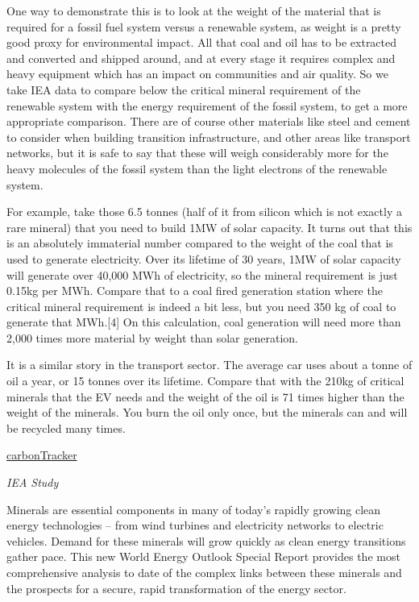 \documentclass[
]{book}
\begin{document}
One way to demonstrate this is to look at the weight of the material that is required for a fossil fuel system versus a renewable system, as weight is a pretty good proxy for environmental impact. All that coal and oil has to be extracted and converted and shipped around, and at every stage it requires complex and heavy equipment which has an impact on communities and air quality. So we take IEA data to compare below the critical mineral requirement of the renewable system with the energy requirement of the fossil system, to get a more appropriate comparison. There are of course other materials like steel and cement to consider when building transition infrastructure, and other areas like transport networks, but it is safe to say that these will weigh considerably more for the heavy molecules of the fossil system than the light electrons of the renewable system.

For example, take those 6.5 tonnes (half of it from silicon which is not exactly a rare mineral) that you need to build 1MW of solar capacity. It turns out that this is an absolutely immaterial number compared to the weight of the coal that is used to generate electricity. Over its lifetime of 30 years, 1MW of solar capacity will generate over 40,000 MWh of electricity, so the mineral requirement is just 0.15kg per MWh. Compare that to a coal fired generation station where the critical mineral requirement is indeed a bit less, but you need 350 kg of coal to generate that MWh.{[}4{]} On this calculation, coal generation will need more than 2,000 times more material by weight than solar generation.

It is a similar story in the transport sector. The average car uses about a tonne of oil a year, or 15 tonnes over its lifetime. Compare that with the 210kg of critical minerals that the EV needs and the weight of the oil is 71 times higher than the weight of the minerals. You burn the oil only once, but the minerals can and will be recycled many times.

\href{https://carbontracker.org/mineral-constraints-for-transition-overstated-by-iea/}{carbonTracker}

\emph{IEA Study}

Minerals are essential components in many of today's rapidly growing clean energy technologies -- from wind turbines and electricity networks to electric vehicles. Demand for these minerals will grow quickly as clean energy transitions gather pace. This new World Energy Outlook Special Report provides the most comprehensive analysis to date of the complex links between these minerals and the prospects for a secure, rapid transformation of the energy sector.
\end{document}
